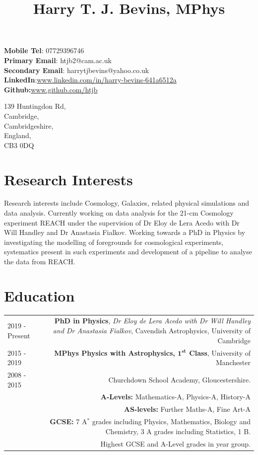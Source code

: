 \documentclass[12pt]{article}
\title{\bfseries\Huge Harry T. J. Bevins, MPhys}
\author{}
\date{}
\begin{document}
	\maketitle
	\begin{minipage}[ht]{0.6\linewidth}
		\textbf{Mobile Tel}: 07729396746 \\
		\textbf{Primary Email}: htjb2@cam.ac.uk \\
		\textbf{Secondary Email}: harrytjbevins@yahoo.co.uk \\
		\textbf{LinkedIn}:\url{www.linkedin.com/in/harry-bevins-641a6512a} \\
		\textbf{Github:}\url{www.github.com/htjb}
	\end{minipage}
	\begin{minipage}[ht]{0.3\linewidth}
		\begin{flushright}
		139 Huntingdon Rd,\\
		Cambridge,\\
		Cambridgeshire,\\
		England,\\
		CB3 0DQ
		\end{flushright}
	\end{minipage}
	
	\section*{Research Interests}
	
	Research interests include Cosmology, Galaxies, related physical simulations and data analysis. Currently working on data analysis for the 21-cm Cosmology experiment REACH under the supervision of Dr Eloy de Lera Acedo with Dr Will Handley and Dr Anastasia Fialkov. Working towards a PhD in Physics by investigating the modelling of foregrounds for cosmological experiments, systematics present in such experiments and development of a pipeline to analyse the data from REACH.
	
	\section*{Education}
	\begin{tabular}{L!{\vrule}R}
		2019 - Present & \textbf{PhD in Physics}, \textit{Dr Eloy de Lera Acedo with Dr Will Handley and Dr Anastasia Fialkov}, Cavendish Astrophysics, University of Cambridge \\
		2015 - 2019 & \textbf{MPhys Physics with Astrophysics, $\mathbf{1^{st}}$ Class}, University of Manchester \\
		2008 - 2015 & Churchdown School Academy, Gloucestershire. \\ &\textbf{A-Levels:} Mathematics-A, Physics-A, History-A \\ &\textbf{AS-levels:} Further Maths-A, Fine Art-A \\ &\textbf{GCSE:} 7 A$^*$ grades including Physics, Mathematics, Biology and Chemistry, 3 A grades including Statistics, 1 B. \\ & Highest GCSE and A-Level grades in year group.
	\end{tabular}
\end{document}
